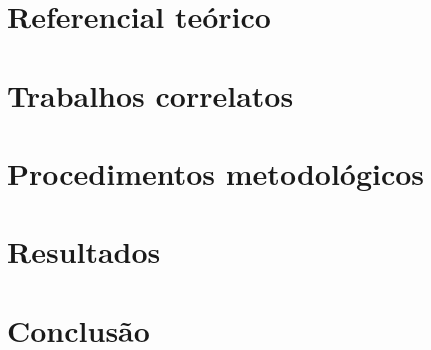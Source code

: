 \documentclass[
	11pt,				%
	openright,			%
	oneside,			%
	a4paper,			%
	english,			%
	brazil,				%
	]{abntex2}
\begin{document}
\chapter{Referencial teórico}



\chapter{Trabalhos correlatos}


\chapter{Procedimentos metodológicos}



%

%

%

\chapter{Resultados}
\label{resultados}


% 

\chapter[Conclusão]{Conclusão}
\label{conclusao}



\postextual
\end{document}

